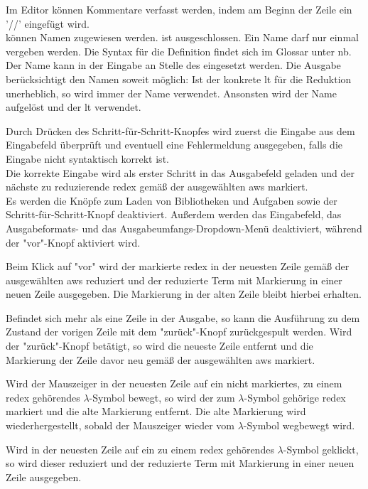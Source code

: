 \documentclass[parskip=full,11pt,twoside]{scrartcl}
\begin{document}
Im Editor können Kommentare verfasst werden, 
indem am Beginn der Zeile ein '//' eingefügt wird.\\
 können Namen zugewiesen werden.
 ist ausgeschlossen. Ein Name darf nur einmal vergeben werden.
Die Syntax für die Definition findet sich im Glossar unter \gls{nb}.
Der Name kann in der Eingabe an Stelle des  eingesetzt werden.
Die Ausgabe berücksichtigt den Namen soweit möglich:
Ist der konkrete \gls{lt} für die Reduktion unerheblich, so wird immer der Name verwendet.
Ansonsten wird der Name aufgelöst und der \gls{lt} verwendet.

Durch Drücken des Schritt-für-Schritt-Knopfes wird zuerst die Eingabe aus dem Eingabefeld überprüft und eventuell eine Fehlermeldung ausgegeben, falls die Eingabe nicht syntaktisch korrekt ist. \\
Die korrekte Eingabe wird als erster Schritt in das Ausgabefeld geladen und der nächste zu reduzierende \gls{redex} gemäß der ausgewählten \gls{aws} markiert. \\
Es werden die Knöpfe zum Laden von Bibliotheken und Aufgaben sowie der Schritt-für-Schritt-Knopf deaktiviert.
Außerdem werden das Eingabefeld, das Ausgabeformats- und das Ausgabeumfangs-Dropdown-Menü deaktiviert, während der "vor"-Knopf aktiviert wird.

Beim Klick auf "vor" wird der markierte \gls{redex} in der neuesten Zeile gemäß der ausgewählten \gls{aws} reduziert und der reduzierte Term mit Markierung in einer neuen Zeile ausgegeben.
Die Markierung in der alten Zeile bleibt hierbei erhalten.

Befindet sich mehr als eine Zeile in der Ausgabe, so kann die Ausführung zu dem Zustand der vorigen Zeile mit dem "zurück"-Knopf zurückgespult werden.
Wird der "zurück"-Knopf betätigt, so wird die neueste Zeile entfernt und die Markierung der Zeile davor neu gemäß der ausgewählten \gls{aws} markiert.

Wird der Mauszeiger in der neuesten Zeile auf ein nicht markiertes, zu einem \gls{redex} gehörendes $\lambda$-Symbol bewegt, so wird der zum $\lambda$-Symbol gehörige \gls{redex} markiert und die alte Markierung entfernt. Die alte Markierung wird wiederhergestellt, sobald der Mauszeiger wieder vom $\lambda$-Symbol wegbewegt wird.

Wird in der neuesten Zeile auf ein zu einem \gls{redex} gehörendes $\lambda$-Symbol geklickt, so wird dieser reduziert und der reduzierte Term mit Markierung in einer neuen Zeile ausgegeben.
\end{document}
